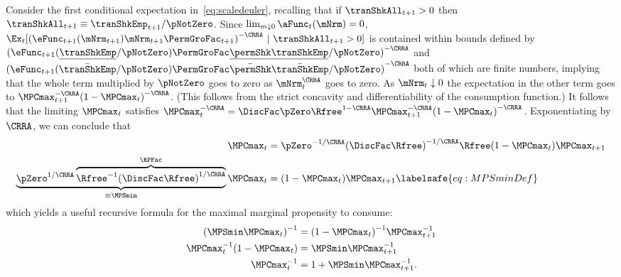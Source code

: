 \documentclass[\econtexRoot/BufferStockTheory]{subfiles}
\begin{document}
Consider the first conditional expectation in~\eqref{eq:scaledeuler},
recalling that if $\tranShkAll_{t+1}>0$ then $\tranShkAll_{t+1} \equiv
\tranShkEmp_{t+1}/\pNotZero$.
Since $\lim_{m \downarrow 0}
\aFunc_{t}(\mNrm) = 0$,
$\Ex_{t}[{(\eFunc_{t+1}(\mNrm_{t+1})\mNrm_{t+1}\PermGroFac_{t+1})}^{-\CRRA}~|~\tranShkAll_{t+1}>0]$
is contained within bounds defined by
${(\eFunc_{t+1}(\underline{\tranShkEmp}/\pNotZero) \PermGroFac\underline{\permShk}
\underline{\tranShkEmp}/\pNotZero)}^{-\CRRA}$ and
${(\eFunc_{t+1}(\bar{\tranShkEmp}/\pNotZero) \PermGroFac\bar{\permShk}
\bar{\tranShkEmp}/\pNotZero)}^{-\CRRA}$ both of which are finite numbers,
implying that the whole term multiplied by $\pNotZero$ goes to zero as
$\mNrm_{t}^{\CRRA}$ goes to zero.
As $\mNrm_{t} \downarrow 0$ the
expectation in the other term goes to $\MPCmax _{t+1}^{-\CRRA
}{(1-\MPCmax _{t})}^{-\CRRA }$.
(This follows from the strict concavity
and differentiability of the consumption function.) It follows that
the limiting $\MPCmax_{t}$ satisfies $\MPCmax_{t}^{-\CRRA }=\DiscFac
\pZero\Rfree^{1-\CRRA }\MPCmax_{t+1}^{-\CRRA }{(1-\MPCmax
_{t})}^{-\CRRA }$.
Exponentiating by $\CRRA$, we can conclude that
\begin{equation}\begin{gathered}\begin{aligned}
\MPCmax_{t} & = \pZero^{-1/\CRRA} {(\DiscFac
\Rfree)}^{-1/\CRRA}\Rfree(1-\MPCmax _{t})\MPCmax _{t+1} \notag
\\ \underbrace{\pZero^{1/\CRRA}\overbrace{{\Rfree}^{-1}{(\DiscFac
    \Rfree)}^{1/\CRRA}}^{\RPFac}}_{\equiv \MPSmin}
\MPCmax_{t} & = (1-\MPCmax _{t})\MPCmax _{t+1} \labelsafe{eq:MPSminDef}
\end{aligned}\end{gathered}\end{equation}
which yields a useful recursive formula for the maximal marginal propensity to consume:
\begin{equation}\begin{gathered}\begin{aligned}
  {(\MPSmin \MPCmax_{t})}^{-1}  & = {(1-\MPCmax_{t})}^{-1}\MPCmax_{t+1}^{-1}  \notag
\\ \MPCmax_{t}^{-1}(1-\MPCmax_{t})  & = \MPSmin \MPCmax_{t+1}^{-1}   \notag
\\ \MPCmax_{t}^{-1}  & = 1+\MPSmin \MPCmax_{t+1}^{-1} \label{eq:MPCmaxInvApndx}.
\end{aligned}\end{gathered}\end{equation}
\end{document}

